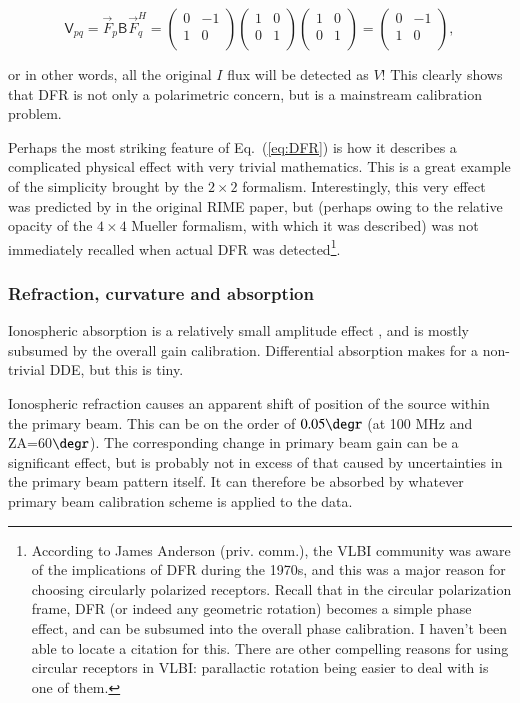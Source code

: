 \documentclass{aa}
\newcommand{\matrixtt}[4]{\left( \begin{array}{cc}#1&#2\\#3&#4\\\end{array} \right)}
\newcommand{\herm}{H}
\newcommand{\jones}[2]{\vec {#1}_{#2}}
\newcommand{\jonesT}[2]{\vec {#1}^{\herm}_{#2}}
\newcommand{\coh}[2]{\mathsf{{#1}}_{{#2}}}
\begin{document}
\begin{equation}\label{eq:DFR}
\coh{V}{pq} = \jones{F}{p}\coh{B}{}\jonesT{F}{q} = \matrixtt{0}{-1}{1}{0} \matrixtt{1}{0}{0}{1} \matrixtt{1}{0}{0}{1} = \matrixtt{0}{-1}{1}{0},
\end{equation}

or in other words, all the original $I$ flux will be detected as $V$! This clearly shows that DFR is not only a polarimetric concern, but is a mainstream calibration problem.

Perhaps the most striking feature of Eq.~(\ref{eq:DFR}) is how it describes a complicated physical effect with very trivial mathematics. This is a great example of the simplicity brought by the $2\times2$ formalism. Interestingly, this very effect was predicted by \citet{ME1} in the original RIME paper, but (perhaps owing to the relative opacity of the $4\times4$ Mueller formalism, with which it was described) was not immediately recalled when actual DFR was detected\footnote{According to James Anderson (priv. comm.), the VLBI community was aware of the implications of DFR during the 1970s, and this was a major reason for choosing circularly polarized receptors. Recall that in the circular polarization frame, DFR (or indeed any geometric rotation) becomes a simple phase effect, and can be subsumed into the overall phase calibration. I haven't been able to locate a citation for this. There are other compelling reasons for using circular receptors in VLBI: parallactic rotation being easier to deal with is one of them.}.

\subsubsection{Refraction, curvature and absorption}

Ionospheric absorption is a relatively small amplitude effect \citep[e.g. 0.1 dB at 100 MHz and ZA=60$\degr$, see][]{tms}, and is mostly subsumed by the overall gain calibration. Differential absorption makes for a non-trivial DDE, but this is tiny.

Ionospheric refraction causes an apparent shift of position of the source within the primary beam. This can be on the order of $0.05\degr$ (at 100 MHz and ZA=60$\degr$). The corresponding change in primary beam gain can be a significant effect, but is probably not in excess of that caused by uncertainties in the primary beam pattern itself. It can therefore be absorbed by whatever primary beam calibration scheme is applied to the data.
\end{document}
